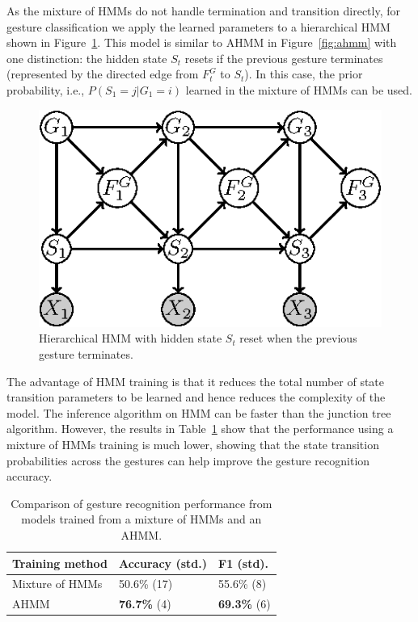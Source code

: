 \documentclass{sigchi}
\newcommand\tabhead[1]{\small\textbf{#1}}
\begin{document}
As the mixture of HMMs do not handle termination and transition directly, for gesture classification we apply
the learned parameters to a hierarchical HMM shown in
Figure~\ref{fig:ahmm-reset}. This model is similar to AHMM in
Figure~\ref{fig:ahmm} with one distinction: the hidden state $S_t$ resets if
the previous gesture terminates (represented by the directed edge from $F_t^G$
to $S_t$). In this case, the prior probability, i.e., $P(S_1 = j | G_1 = i)$
learned in the mixture of HMMs can be used.

\begin{figure}
\centering
\includegraphics[]{figure/ahmm-reset.eps}
\caption{Hierarchical HMM with hidden state $S_t$ reset when the previous gesture terminates.}
\label{fig:ahmm-reset}
\end{figure}

The advantage of HMM training is that it reduces the total number of
state transition parameters to be learned and hence reduces the
complexity of the model. The inference algorithm on HMM can be faster than
the junction tree algorithm. However, the results in Table~\ref{tab:training}
show that the performance using a mixture of HMMs training is much lower, showing
that the state transition probabilities across the gestures can help improve the
gesture recognition accuracy.

\begin{table}[t]
\centering
\begin{tabular}{|l|l|l|}
\hline
\tabhead{Training method} & {\tabhead{Accuracy (std.)}} & {\tabhead{F1 (std).}}\\
\hline
Mixture of HMMs & 50.6\% (17) & 55.6\% (8) \\
\hline
AHMM & \textbf{76.7\%} (4) & \textbf{69.3\%} (6) \\
\hline
\end{tabular}
\caption{Comparison of gesture recognition performance from models trained from a mixture of HMMs and an AHMM.}
\label{tab:training}
\end{table}
\end{document}
